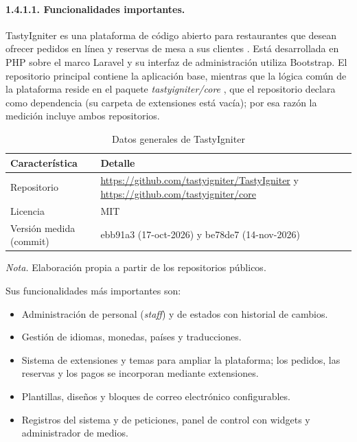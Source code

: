 \paragraph{1.4.1.1. Funcionalidades importantes.}

TastyIgniter es una plataforma de código abierto para restaurantes que desean ofrecer pedidos en línea y reservas de mesa a sus clientes \parencite{tastyigniter2026}. Está desarrollada en PHP sobre el marco Laravel y su interfaz de administración utiliza Bootstrap. El repositorio principal contiene la aplicación base, mientras que la lógica común de la plataforma reside en el paquete \textit{tastyigniter/core} \parencite{tastyignitercore2026}, que el repositorio declara como dependencia (su carpeta de extensiones está vacía); por esa razón la medición incluye ambos repositorios.

\begin{table}[H]
\caption{Datos generales de TastyIgniter}
\label{tab:ref1_datos}
\begin{threeparttable}
\begin{tabular}{>{\raggedright\arraybackslash}p{6.2cm} >{\raggedright\arraybackslash}p{6.8cm}}
\toprule
Característica & Detalle \\
\midrule
Repositorio & \url{https://github.com/tastyigniter/TastyIgniter} y \url{https://github.com/tastyigniter/core} \\
Licencia & MIT \\
Versión medida (commit) & ebb91a3 (17-oct-2026) y be78de7 (14-nov-2026) \\
\bottomrule
\end{tabular}
\begin{tablenotes}
\item \textit{Nota.} Elaboración propia a partir de los repositorios públicos.
\end{tablenotes}
\end{threeparttable}
\end{table}

Sus funcionalidades más importantes son:

\begin{itemize}
    \item Administración de personal (\textit{staff}) y de estados con historial de cambios.
    \item Gestión de idiomas, monedas, países y traducciones.
    \item Sistema de extensiones y temas para ampliar la plataforma; los pedidos, las reservas y los pagos se incorporan mediante extensiones.
    \item Plantillas, diseños y bloques de correo electrónico configurables.
    \item Registros del sistema y de peticiones, panel de control con widgets y administrador de medios.
\end{itemize}

